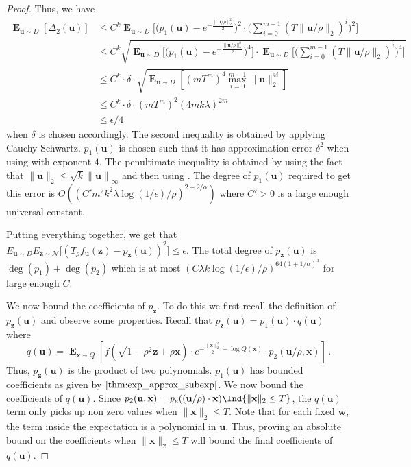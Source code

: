 \documentclass[10pt,a4paper]{article}
\newcommand\twonorm[1]{\|#1\|_2}
\newcommand\norm[1]{\left\| #1 \right\|}
\renewcommand\vec[1]{\mathbf{#1}}
\DeclareMathOperator*{\E}{\mathbf{E}}
\newcommand{\1}{\Ind}
\newcommand{\x}{\vec x}
\newcommand{\vu}{\vec u}
\newcommand{\vw}{\vec w}
\newcommand{\z}{\vec z}
\newcommand{\Gauss}{\mathcal{N}}
\begin{document}
\begin{proof}
Thus, we have 
\begin{align*}
    \E_{\vu\sim D}\left[\Delta_2(\vu)\right]&\leq C^{k}\E_{\vu\sim D}\biggl[\bigl(p_1(\vu)-e^{-\frac{\twonorm{\vu/\rho}^2}{2}}\bigr)^2\cdot\biggl(\sum_{i=0}^{m-1}(T\twonorm{\vu/\rho})^i\biggr)^2\biggr]\\
   & \leq C^k\sqrt{\E_{\vu\sim D}\biggl[\biggl(p_1(\vu)-e^{-\frac{\twonorm{\vu/\rho}^2}{2}}\biggr)^4\biggr]\cdot\E_{\vu\sim D}\biggl[\biggl({\sum_{i=0}^{m-1}(T\twonorm{\vu/\rho})^i}\biggr)^{4}\biggr]}\\
   &\leq C^k\cdot \delta \cdot \sqrt{\E_{\vu\sim D}\left[(mT^{m})^{4}\max_{i=0}^{m-1}\twonorm{\vu}^{4i}\right]}\\
    & \leq C^k\cdot \delta\cdot (mT^m)^2(4mk\lambda)^{2m}  \\
    &\leq \epsilon/4
 \end{align*}
when $\delta$ is chosen accordingly. The second inequality is obtained by applying Cauchy-Schwartz.  $p_1(\vu)$ is chosen such that it has approximation error $\delta^2$ when using  with exponent $4$. The penultimate inequality is obtained by using the fact that $\twonorm{\vu}\leq \sqrt{k}\norm{\vu}_{\infty}$ and then using . The degree of $p_1(\vu)$ required to get this error is $O\left((C'm^2k^2\lambda\log(1/\epsilon)/\rho)^{2+2/\alpha}\right)$ where $C'>0$ is a large enough universal constant.


Putting everything together, we get that $E_{\vu\sim D}E_{\z\sim \Gauss}\bigl[(T_{\rho}f_{\vu}(\z)-p_{\z}(\vu))^2\bigr]\leq \epsilon$. The total degree of $p_{\z}(\vu)$ is $\deg(p_1)+\deg(p_2)$ which is at most $\left(C\lambda k\log (1/\epsilon)/\rho\right)^{64(1+1/\alpha)^3} $ for large enough $C$.

We now bound the coefficients of $p_{\z}$. To do this we first recall the definition of $p_{\z}(\vu)$ and observe some properties. Recall that $p_{\z}(\vu)=p_1(\vu)\cdot q(\vu)$ where \[q(\vu)=\E_{\x\sim Q}\left[f(\sqrt{1-\rho^2}\z+\rho\x)\cdot e^{-\frac{\twonorm{\x}^2}{2}-\log Q(\x)}\cdot p_2(\vu/\rho,\x)\right]\,.\] Thus, $p_{\z}(\vu)$ is the product of two polynomials. $p_1(\vu)$ has bounded coefficients as given by $\Cref{thm:exp_approx_subexp}$. We now bound the coefficients of $q(\vu)$. Since $p_2(\vu,\x)=p_e((\vu/\rho)\cdot \x)\1\{\twonorm{\x}\leq T\}$, the $q(\vu)$ term only picks up non zero values when $\twonorm{\x}\leq T$. Note that for each fixed $\vw$, the term inside the expectation is a polynomial in $\vu$. Thus, proving an absolute bound on the coefficients when $\twonorm{\x}\leq T$ will bound the final coefficients of $q(\vu)$. 


\end{proof}
\end{document}
